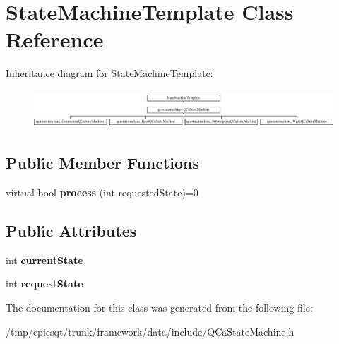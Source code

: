\hypertarget{classStateMachineTemplate}{
\section{StateMachineTemplate Class Reference}
\label{classStateMachineTemplate}
}
Inheritance diagram for StateMachineTemplate:\begin{figure}[H]
\begin{center}
\leavevmode
\includegraphics[height=1.438356cm]{classStateMachineTemplate}
\end{center}
\end{figure}
\subsection*{Public Member Functions}
\begin{DoxyCompactItemize}
\item 
\hypertarget{classStateMachineTemplate_aacb2be332f893b49e547a75738992204}{
virtual bool {\bfseries process} (int requestedState)=0}
\label{classStateMachineTemplate_aacb2be332f893b49e547a75738992204}

\end{DoxyCompactItemize}
\subsection*{Public Attributes}
\begin{DoxyCompactItemize}
\item 
\hypertarget{classStateMachineTemplate_a3bd9f866f5731530ab596db9063d3b8c}{
int {\bfseries currentState}}
\label{classStateMachineTemplate_a3bd9f866f5731530ab596db9063d3b8c}

\item 
\hypertarget{classStateMachineTemplate_ae841f1ab4494df6d82479130ed1b31f7}{
int {\bfseries requestState}}
\label{classStateMachineTemplate_ae841f1ab4494df6d82479130ed1b31f7}

\end{DoxyCompactItemize}


The documentation for this class was generated from the following file:\begin{DoxyCompactItemize}
\item 
/tmp/epicsqt/trunk/framework/data/include/QCaStateMachine.h\end{DoxyCompactItemize}
